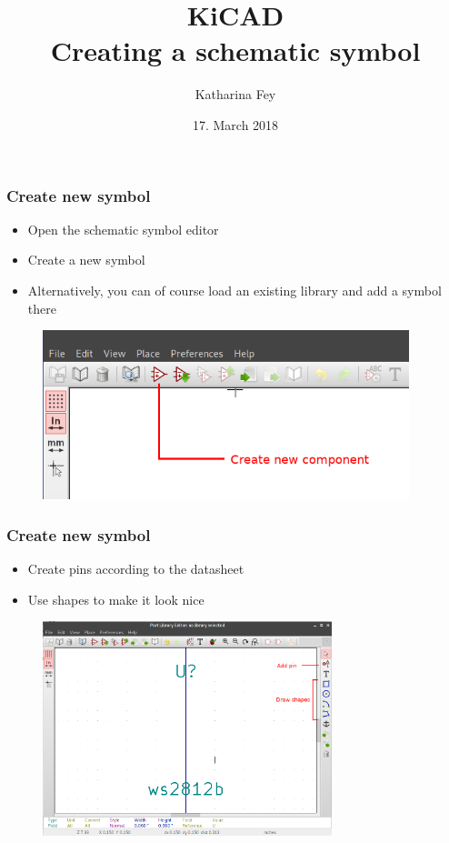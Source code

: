 \documentclass{beamer}
\begin{document}
\title{KiCAD\\Creating a schematic symbol}
\author{Katharina Fey}
\date{17. March 2018}

\frame{\titlepage}


\begin{frame}
  \frametitle{Create new symbol}
  \begin{itemize}
    \item Open the schematic symbol editor
    \item Create a new symbol
    \item Alternatively, you can of course load an existing library and add a symbol there
  \end{itemize}
  \begin{figure}[H]
    \centering
    \includegraphics[width=0.95\textwidth]{images/step_01.png}
  \end{figure}
\end{frame}


\begin{frame}
  \frametitle{Create new symbol}
  \begin{itemize}
    \item Create pins according to the datasheet
    \item Use shapes to make it look nice
  \end{itemize}
  \begin{figure}[H]
    \centering
    \includegraphics[width=0.75\textwidth]{images/step_02.png}
  \end{figure}
\end{frame}
\end{document}
